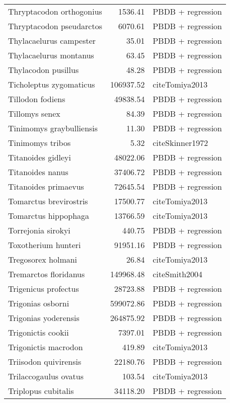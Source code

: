 \begin{table}[ht]
\begin{tabular}{lrl}
  Thryptacodon orthogonius & 1536.41 & PBDB + regression \\ 
  Thryptacodon pseudarctos & 6070.61 & PBDB + regression \\ 
  Thylacaelurus campester & 35.01 & PBDB + regression \\ 
  Thylacaelurus montanus & 63.45 & PBDB + regression \\ 
  Thylacodon pusillus & 48.28 & PBDB + regression \\ 
  Ticholeptus zygomaticus & 106937.52 & cite{Tomiya2013} \\ 
  Tillodon fodiens & 49838.54 & PBDB + regression \\ 
  Tillomys senex & 84.39 & PBDB + regression \\ 
  Tinimomys graybulliensis & 11.30 & PBDB + regression \\ 
  Tinimomys tribos & 5.32 & cite{Skinner1972} \\ 
  Titanoides gidleyi & 48022.06 & PBDB + regression \\ 
  Titanoides nanus & 37406.72 & PBDB + regression \\ 
  Titanoides primaevus & 72645.54 & PBDB + regression \\ 
  Tomarctus brevirostris & 17500.77 & cite{Tomiya2013} \\ 
  Tomarctus hippophaga & 13766.59 & cite{Tomiya2013} \\ 
  Torrejonia sirokyi & 440.75 & PBDB + regression \\ 
  Toxotherium hunteri & 91951.16 & PBDB + regression \\ 
  Tregosorex holmani & 26.84 & cite{Tomiya2013} \\ 
  Tremarctos floridanus & 149968.48 & cite{Smith2004} \\ 
  Trigenicus profectus & 28723.88 & PBDB + regression \\ 
  Trigonias osborni & 599072.86 & PBDB + regression \\ 
  Trigonias yoderensis & 264875.92 & PBDB + regression \\ 
  Trigonictis cookii & 7397.01 & PBDB + regression \\ 
  Trigonictis macrodon & 419.89 & cite{Tomiya2013} \\ 
  Triisodon quivirensis & 22180.76 & PBDB + regression \\ 
  Trilaccogaulus ovatus & 103.54 & cite{Tomiya2013} \\ 
  Triplopus cubitalis & 34118.20 & PBDB + regression \\ 

\end{tabular}
\end{table}
